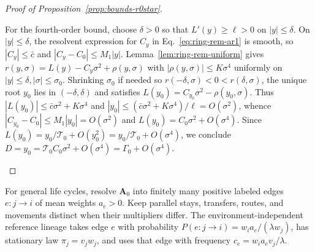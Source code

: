 \begin{proof}[Proof of Proposition~{\upshape\ref{prop:bounds-r0star}}]
\begin{enumerate}
For the fourth-order bound, choose $\delta > 0$ so that $L'(y) \ge \ell > 0$ on $|y| \le \delta$. On $|y| \le \delta$, the resolvent expression for $C_y$ in Eq.~\eqref{eq:ring-rem-ar1} is smooth, so $|C_y| \le \bar{c}$ and $|C_y - C_0| \le M_1|y|$. Lemma~\ref{lem:ring-rem-uniform} gives $r(y, \sigma) = L(y) - C_y\sigma^2 + \rho(y, \sigma)$ with $|\rho(y, \sigma)| \le K\sigma^4$ uniformly on $|y| \le \delta, |\sigma| \le \sigma_0$. Shrinking $\sigma_0$ if needed so $r(-\delta, \sigma) < 0 < r(\delta, \sigma)$, the unique root $y_0$ lies in $(-\delta, \delta)$ and satisfies $L(y_0) = C_{y_0}\sigma^2 - \rho(y_0, \sigma)$. Thus $|L(y_0)| \le \bar{c}\sigma^2 + K\sigma^4$ and $|y_0| \le (\bar{c}\sigma^2 + K\sigma^4)/\ell = O(\sigma^2)$, whence $|C_{y_0} - C_0| \le M_1|y_0| = O(\sigma^2)$ and $L(y_0) = C_0\sigma^2 + O(\sigma^4)$. Since $L(y_0) = y_0/\mathcal{T}_0 + O(y_0^2) = y_0/\mathcal{T}_0 + O(\sigma^4)$, we conclude $D = y_0 = \mathcal{T}_0 C_0\sigma^2 + O(\sigma^4) = \Gamma_0 + O(\sigma^4)$. \qedhere
\end{enumerate}
\end{proof}

For general life cycles, resolve $\mathbf{A}_0$ into finitely many positive labeled edges $e: j \to i$ of mean weights $a_e > 0$. Keep parallel stays, transfers, routes, and movements distinct when their multipliers differ. The environment-independent reference lineage takes edge $e$ with probability $P(e: j \to i) = w_i a_e / (\lambda w_j)$, has stationary law $\pi_j = v_j w_j$, and uses that edge with frequency $c_e = w_i a_e v_j / \lambda$.

